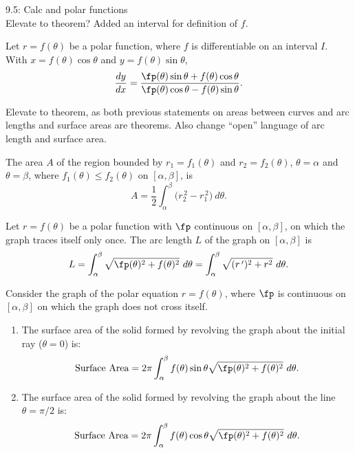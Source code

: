 \documentclass{article}
\begin{document}
9.5: Calc and polar functions\\

Elevate to theorem? Added an interval for definition of $f$.

{Let $r=f(\theta)$ be a polar function, where $f$ is differentiable on an interval $I$. With $x=f(\theta)\cos\theta$ and $y=f(\theta)\sin\theta$,
$$\frac{dy}{dx} = \frac{\fp(\theta)\sin\theta+f(\theta)\cos\theta}{\fp(\theta)\cos\theta-f(\theta)\sin\theta}.$$
}

Elevate to theorem, as both previous statements on areas between curves  and arc lengths and surface areas are theorems. Also change ``open'' language of arc length and surface area.

{The area $A$ of the region bounded by $r_1=f_1(\theta)$ and $r_2=f_2(\theta)$, $\theta=\alpha$ and $\theta=\beta$, where $f_1(\theta)\leq f_2(\theta)$ on $[\alpha,\beta]$, is
$$A = \frac12\int_\alpha^\beta \big(r_2^{\,2}-r_1^{\,2}\big)\ d\theta.$$
}

{Let  $r=f(\theta)$ be a polar function with $\fp$ continuous on $[\alpha,\beta]$, on which the graph traces itself only once. The arc length $L$ of the graph on $[\alpha,\beta]$ is
$$L = \int_\alpha^\beta \sqrt{\fp(\theta)^2+f(\theta)^2}\ d\theta = \int_\alpha^\beta\sqrt{(r\,')^2+ r^2}\ d\theta.$$
}

{Consider the graph of the polar equation $r=f(\theta)$, where $\fp$ is continuous on  $[\alpha,\beta]$ on which the graph does not cross itself.
	\begin{enumerate}
		\item The surface area of the solid formed by revolving the graph about the initial ray ($\theta=0$) is:
		$$\text{Surface Area} = 2\pi\int_\alpha^\beta f(\theta)\sin\theta\sqrt{\fp(\theta)^2+f(\theta)^2}\ d\theta.$$
		\item The surface area of the solid formed by revolving the graph about the line $\theta=\pi/2$ is:
		$$\text{Surface Area} = 2\pi\int_\alpha^\beta f(\theta)\cos\theta\sqrt{\fp(\theta)^2+f(\theta)^2}\ d\theta.$$
	\end{enumerate}
}
\end{document}
